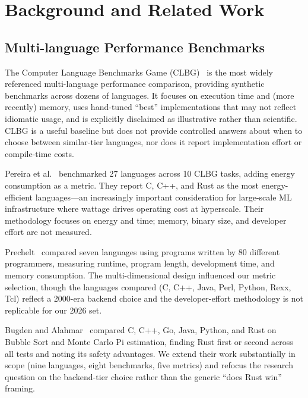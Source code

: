 \documentclass[10pt,conference]{IEEEtran}
\begin{document}
\section{Background and Related Work}
\label{sec:related}

\subsection{Multi-language Performance Benchmarks}

The Computer Language Benchmarks Game (CLBG)~\cite{clbg} is the most
widely referenced multi-language performance comparison, providing
synthetic benchmarks across dozens of languages. It focuses on
execution time and (more recently) memory, uses hand-tuned ``best''
implementations that may not reflect idiomatic usage, and is
explicitly disclaimed as illustrative rather than scientific. CLBG is
a useful baseline but does not provide controlled answers about when
to choose between similar-tier languages, nor does it report
implementation effort or compile-time costs.

Pereira et al.~\cite{pereira2017energy} benchmarked 27 languages
across 10 CLBG tasks, adding energy consumption as a metric. They
report C, C++, and Rust as the most energy-efficient
languages---an increasingly important consideration for
large-scale ML infrastructure where wattage drives operating cost
at hyperscale. Their methodology focuses on energy and time;
memory, binary size, and developer effort are not measured.

Prechelt~\cite{prechelt2000empirical} compared seven languages
using programs written by 80 different programmers, measuring
runtime, program length, development time, and memory consumption.
The multi-dimensional design influenced our metric selection,
though the languages compared (C, C++, Java, Perl, Python, Rexx,
Tcl) reflect a 2000-era backend choice and the developer-effort
methodology is not replicable for our 2026 set.

Bugden and Alahmar~\cite{bugden2022igscong,bugden2022safety}
compared C, C++, Go, Java, Python, and Rust on Bubble Sort and
Monte Carlo Pi estimation, finding Rust first or second across
all tests and noting its safety advantages. We extend their work
substantially in scope (nine languages,
eight benchmarks, five metrics) and refocus the research question
on the backend-tier choice rather than the generic ``does Rust
win'' framing.
\end{document}
